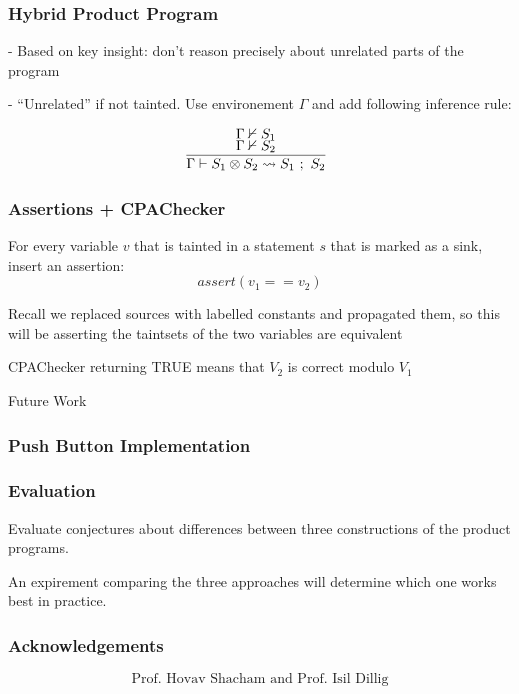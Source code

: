 \documentclass{beamer} %
\theoremstyle{definition} %
\newcommand{\cross}{\otimes{}}
\begin{document}
\begin{frame}
\frametitle{Hybrid Product Program}

	- Based on key insight: don't reason precisely about unrelated parts of the program

	- ``Unrelated'' if not tainted. Use environement $\Gamma$ and add following inference rule:

	\[
		\begin{array}{c}
			\infer[]{\Gamma \vdash S_1 \cross S_2 \leadsto S_1\ ;\ S_2}{
				\Gamma \nvdash S_1 \\
				\Gamma \nvdash S_2
			} \\
		\end{array}
	\]
	
\end{frame}

\begin{frame}
\frametitle{Assertions + CPAChecker}
	
	For every variable $v$ that is tainted in a statement $s$ that is marked as a sink, insert an assertion: \[assert(v_1 == v_2)\]

	Recall we replaced sources with labelled constants and propagated them, so this will be asserting the taintsets of the two variables are equivalent

	CPAChecker returning TRUE means that $V_2$ is correct modulo $V_1$

\end{frame}

\begin{frame}
	Future Work
\end{frame}

\begin{frame}
\frametitle{Push Button Implementation}
	
\end{frame}

\begin{frame}
\frametitle{Evaluation}
	
	Evaluate conjectures about differences between three constructions of the product programs. 

	An expirement comparing the three approaches will determine which one works best in practice. 

\end{frame}


\begin{frame}
\frametitle{Acknowledgements}
	\[\text{Prof. Hovav Shacham and Prof. Isil Dillig}\]
\end{frame}
\end{document}
